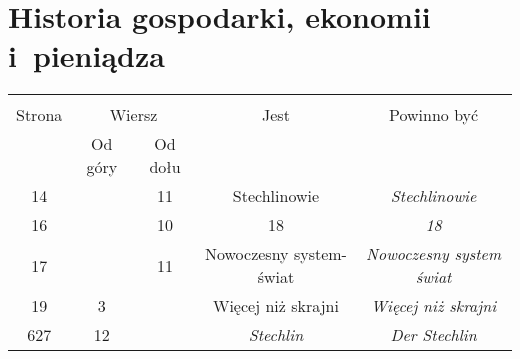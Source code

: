 \documentclass[a4paper,11pt]{article}
\begin{document}
\vspace{\spaceTwo}










\newpage
\section{Historia gospodarki, ekonomii i~pieniądza}

\vspace{\spaceTwo}





\begin{center}
  \begin{tabular}{|c|c|c|c|c|}
    \hline
    & \multicolumn{2}{c|}{} & & \\
    Strona & \multicolumn{2}{c|}{Wiersz} & Jest
                              & Powinno być \\ \cline{2-3}
    & Od góry & Od dołu & & \\
    \hline
    14  & & 11 & Stechlinowie & \emph{Stechlinowie} \\
    16  & & 10 & 18 & \emph{18} \\
    17  & & 11 & Nowoczesny system-świat
           & \emph{Nowoczesny system świat} \\
    19  &  3 & & Więcej niż skrajni & \emph{Więcej niż skrajni} \\
    627 & 12 & & \emph{Stechlin} & \emph{Der Stechlin} \\
    \hline
  \end{tabular}
\end{center}

\vspace{\spaceTwo}
\end{document}
